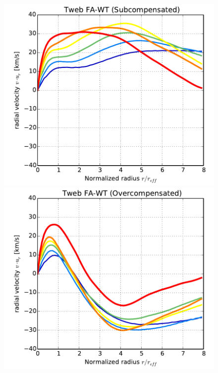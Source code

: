 \documentclass[a4,useAMS,usenatbib,usegraphicx]{mn2e}
\begin{document}
\begin{figure}
\centering  
  \includegraphics[trim = 2mm 2mm 5mm 0mm, clip, keepaspectratio=true,
  width=0.35\textheight]{voids_velocity_TwebFAG0.pdf}
  \includegraphics[trim = 2mm 2mm 5mm 0mm, clip, keepaspectratio=true,
  width=0.35\textheight]{voids_velocity_TwebFAG1.pdf}

\end{figure}
\end{document}
